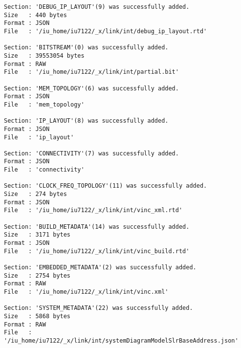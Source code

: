 \begin{lstlisting}[label=some-code-2,caption=Содержимое файла v++\_vinc.log]
Section: 'DEBUG_IP_LAYOUT'(9) was successfully added.
Size   : 440 bytes
Format : JSON
File   : '/iu_home/iu7122/_x/link/int/debug_ip_layout.rtd'

Section: 'BITSTREAM'(0) was successfully added.
Size   : 39553054 bytes
Format : RAW
File   : '/iu_home/iu7122/_x/link/int/partial.bit'

Section: 'MEM_TOPOLOGY'(6) was successfully added.
Format : JSON
File   : 'mem_topology'

Section: 'IP_LAYOUT'(8) was successfully added.
Format : JSON
File   : 'ip_layout'

Section: 'CONNECTIVITY'(7) was successfully added.
Format : JSON
File   : 'connectivity'

Section: 'CLOCK_FREQ_TOPOLOGY'(11) was successfully added.
Size   : 274 bytes
Format : JSON
File   : '/iu_home/iu7122/_x/link/int/vinc_xml.rtd'

Section: 'BUILD_METADATA'(14) was successfully added.
Size   : 3171 bytes
Format : JSON
File   : '/iu_home/iu7122/_x/link/int/vinc_build.rtd'

Section: 'EMBEDDED_METADATA'(2) was successfully added.
Size   : 2754 bytes
Format : RAW
File   : '/iu_home/iu7122/_x/link/int/vinc.xml'

Section: 'SYSTEM_METADATA'(22) was successfully added.
Size   : 5868 bytes
Format : RAW
File   : '/iu_home/iu7122/_x/link/int/systemDiagramModelSlrBaseAddress.json'


\end{lstlisting}

